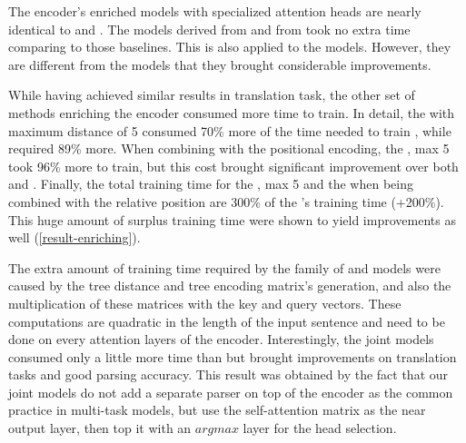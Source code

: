 The encoder's enriched models with specialized attention heads are nearly identical to \transformerbase and \transformerrel.
The \SpecPOS models derived from \transformerbase and from \transformerrel took no extra time comparing to those baselines.
This is also applied to the \SpecDep models. 
However, they are different from the \SpecPOS models that they brought considerable improvements.

While having achieved similar results in translation task, the other set of methods enriching the encoder consumed more time to train.
In detail, the \TreeDistance with maximum distance of 5 consumed 70\% more of the time needed to train \transformerbase, while \TreeTraversal required 89\% more.
When combining with the positional encoding, the \TreeDistance, max 5 took 96\% more to train, but this cost brought significant improvement over both \transformerbase and \transformerrel.
Finally, the total training time for the \TreeDistance, max 5 and the \TreeTraversal when being combined with the relative position are 300\% of the \transformerbase's training time (+200\%). This huge amount of surplus training time were shown to yield improvements as well (\cref{result-enriching}).

The extra amount of training time required by the family of \TreeDistance and \TreeTraversal models were caused by the tree distance and tree encoding matrix's generation, and also the multiplication of these matrices with the key and query vectors.
These computations are quadratic in the length of the input sentence and need to be done on every attention layers of the encoder.
Interestingly, the joint models consumed only a little more time than \transformerbase but brought improvements on translation tasks and good parsing accuracy.
This result was obtained by the fact that our joint models do not add a separate parser on top of the encoder as the common practice in multi-task models, but use the self-attention matrix as the near output layer, then top it with an $argmax$ layer for the head selection.
